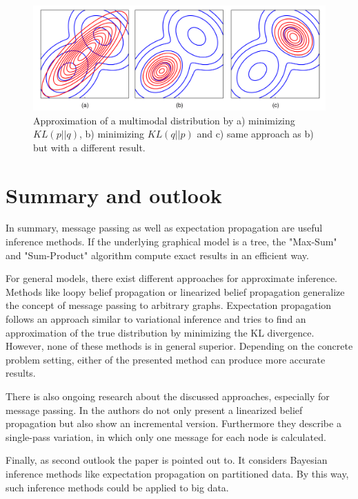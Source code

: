 \documentclass{sigkdd}
\begin{document}
\begin{figure}[h]
	\begin{center}
		\includegraphics[scale=0.12]{multimodal_approximation.png}
		\caption{Approximation of a multimodal distribution by a) minimizing $KL(p||q)$, b) minimizing $KL(q||p)$ and c) same approach as b) but with a different result.}\label{fig:multimodal}
	\end{center}
\end{figure}
\section{Summary and outlook}
In summary, message passing as well as expectation propagation are useful inference methods. If the underlying graphical model is a tree, the "Max-Sum" and "Sum-Product" algorithm compute exact results in an efficient way.

For general models, there exist different approaches for approximate inference. Methods like loopy belief propagation or linearized belief propagation generalize the concept of message passing to arbitrary graphs. Expectation propagation follows an approach similar to variational inference and tries to find an approximation of the true distribution by minimizing the KL divergence.
However, none of these methods is in general superior. Depending on the concrete problem setting, either of the presented method can produce more accurate results.

There is also ongoing research about the discussed approaches, especially for message passing. In \cite{Gatterbauer:2015:LSB:2735479.2735490} the authors do not only present a linearized belief propagation but also show an incremental version. Furthermore they describe a single-pass variation, in which only one message for each node is calculated.

Finally, as second outlook the paper \cite{wayoflife} is pointed out to. It considers Bayesian inference methods like expectation propagation on partitioned data. By this way, such inference methods could be applied to big data.




\nocite{*}
\end{document}
